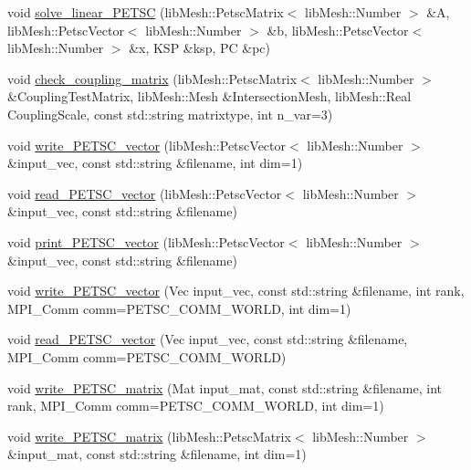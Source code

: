\begin{DoxyCompactItemize}
\item 
void \hyperlink{namespacecarl_a728a8e1963352c97d71b9c3dec0c2244}{solve\+\_\+linear\+\_\+\+P\+E\+T\+S\+C} (lib\+Mesh\+::\+Petsc\+Matrix$<$ lib\+Mesh\+::\+Number $>$ \&A, lib\+Mesh\+::\+Petsc\+Vector$<$ lib\+Mesh\+::\+Number $>$ \&b, lib\+Mesh\+::\+Petsc\+Vector$<$ lib\+Mesh\+::\+Number $>$ \&x, K\+S\+P \&ksp, P\+C \&pc)
\item 
void \hyperlink{namespacecarl_a2a42a81e2c9cc6e97c90f5960e5f1048}{check\+\_\+coupling\+\_\+matrix} (lib\+Mesh\+::\+Petsc\+Matrix$<$ lib\+Mesh\+::\+Number $>$ \&Coupling\+Test\+Matrix, lib\+Mesh\+::\+Mesh \&Intersection\+Mesh, lib\+Mesh\+::\+Real Coupling\+Scale, const std\+::string matrixtype, int n\+\_\+var=3)
\item 
void \hyperlink{namespacecarl_a1632084ec1f296b63559648cc9c2047f}{write\+\_\+\+P\+E\+T\+S\+C\+\_\+vector} (lib\+Mesh\+::\+Petsc\+Vector$<$ lib\+Mesh\+::\+Number $>$ \&input\+\_\+vec, const std\+::string \&filename, int dim=1)
\item 
void \hyperlink{namespacecarl_a4d0e2c60b0765dc8182c95362c5d329a}{read\+\_\+\+P\+E\+T\+S\+C\+\_\+vector} (lib\+Mesh\+::\+Petsc\+Vector$<$ lib\+Mesh\+::\+Number $>$ \&input\+\_\+vec, const std\+::string \&filename)
\item 
void \hyperlink{namespacecarl_a2405b7b44a0806d66bced8d0905dcb04}{print\+\_\+\+P\+E\+T\+S\+C\+\_\+vector} (lib\+Mesh\+::\+Petsc\+Vector$<$ lib\+Mesh\+::\+Number $>$ \&input\+\_\+vec, const std\+::string \&filename)
\item 
void \hyperlink{namespacecarl_a228d257ed2972e42a0468d2d82eb93f9}{write\+\_\+\+P\+E\+T\+S\+C\+\_\+vector} (Vec input\+\_\+vec, const std\+::string \&filename, int rank, M\+P\+I\+\_\+\+Comm comm=P\+E\+T\+S\+C\+\_\+\+C\+O\+M\+M\+\_\+\+W\+O\+R\+L\+D, int dim=1)
\item 
void \hyperlink{namespacecarl_afa5184a7f34cda31fcafd0bae53a17bd}{read\+\_\+\+P\+E\+T\+S\+C\+\_\+vector} (Vec input\+\_\+vec, const std\+::string \&filename, M\+P\+I\+\_\+\+Comm comm=P\+E\+T\+S\+C\+\_\+\+C\+O\+M\+M\+\_\+\+W\+O\+R\+L\+D)
\item 
void \hyperlink{namespacecarl_a431936850bf5712121d8399ddbd76aa8}{write\+\_\+\+P\+E\+T\+S\+C\+\_\+matrix} (Mat input\+\_\+mat, const std\+::string \&filename, int rank, M\+P\+I\+\_\+\+Comm comm=P\+E\+T\+S\+C\+\_\+\+C\+O\+M\+M\+\_\+\+W\+O\+R\+L\+D, int dim=1)
\item 
void \hyperlink{namespacecarl_aa6ac21d50301de8b7b50b23b4e4600e3}{write\+\_\+\+P\+E\+T\+S\+C\+\_\+matrix} (lib\+Mesh\+::\+Petsc\+Matrix$<$ lib\+Mesh\+::\+Number $>$ \&input\+\_\+mat, const std\+::string \&filename, int dim=1)

\end{DoxyCompactItemize}
